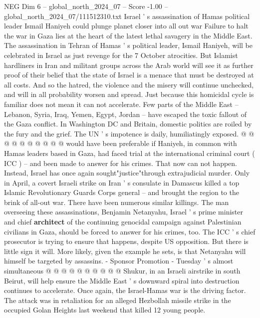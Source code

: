 \begin{textsample}{NEG Dim 6 – global\_north\_2024\_07 – Score -1.00 – global\_north\_2024\_07/111512310.txt}  \label{ex:f6_neg_143}
Israel ' s assassination of Hamas political leader Ismail Haniyeh could plunge planet closer into all out war Failure to halt the war in Gaza lies at the heart of the latest lethal savagery in the Middle East.
The assassination in Tehran of Hamas ' s political leader, Ismail Haniyeh, will be celebrated in Israel as just revenge for the 7 October atrocities.
But Islamist hardliners in Iran and militant groups across the Arab world will see it as further proof of their belief that the state of Israel is a menace that must be destroyed at all costs.
And so the hatred, the violence and the misery will continue unchecked, and will in all probability worsen and spread.
Just because this homicidal cycle is familiar does not mean it can not accelerate.
Few parts of the Middle East -- Lebanon, Syria, Iraq, Yemen, Egypt, Jordan -- have escaped the toxic fallout of the Gaza conflict.
In Washington DC and Britain, domestic politics are roiled by the fury and the grief.
The UN ' s impotence is daily, humiliatingly exposed. @ @ @ @ @ @ @ @ @ @ would have been preferable if Haniyeh, in common with Hamas leaders based in Gaza, had faced trial at the international criminal court ( ICC ) -- and been made to answer for his crimes.
That now can not happen.
Instead, Israel has once again sought"justice"through extrajudicial murder.
Only in April, a covert Israeli strike on Iran ' s consulate in Damascus killed a top Islamic Revolutionary Guards Corps general -- and brought the region to the brink of all-out war.
There have been numerous similar killings.
The man overseeing these assassinations, Benjamin Netanyahu, Israel ' s prime minister and chief \textbf{architect} of the continuing genocidal campaign against Palestinian civilians in Gaza, should be forced to answer for his crimes, too.
The ICC ' s chief prosecutor is trying to ensure that happens, despite US opposition.
But there is little sign it will.
More likely, given the example he sets, is that Netanyahu will himself be targeted by assassins. - Sponsor Promotion - Tuesday ' s almost simultaneous @ @ @ @ @ @ @ @ @ @ Shukur, in an Israeli airstrike in south Beirut, will help ensure the Middle East ' s downward spiral into destruction continues to accelerate.
Once again, the Israel-Hamas war is the driving factor.
The attack was in retaliation for an alleged Hezbollah missile strike in the occupied Golan Heights last weekend that killed 12 young people.

\end{textsample}
